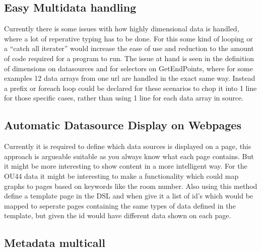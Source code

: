 \subsection{Easy Multidata handling} Currently there is some issues with how highly dimensional data is handled, where a lot of reperative typing has to be done.
For this some kind of looping or a ``catch all iterater'' would increase the ease of use and
reduction to the amount of code required for a program to run. The issue at hand is seen in the
definition of dimensions on datasources and for selectors on GetEndPoints, where for some examples
12 data arrays from one url are handled in the exact same way. Instead a prefix or foreach loop
could be declared for these scenarios to chop it into 1 line for those specific cases, rather
than using 1 line for each data array in source.

\subsection{Automatic Datasource Display on Webpages} Currently it is required to define
which data sources is displayed on a page, this approach is argueable suitable as you always
know what each page contains. But it might be more interesting to show content in a more
intelligent way. For the OU44 data it might be interesting to make a functionality which could
map graphs to pages based on keywords like the room number. Also using this method define a
template page in the DSL and when give it a list of id's which would be mapped to seperate pages
containing the same types of data defined in the template, but given the id would have different
data shown on each page.

\subsection{Metadata multicall}

